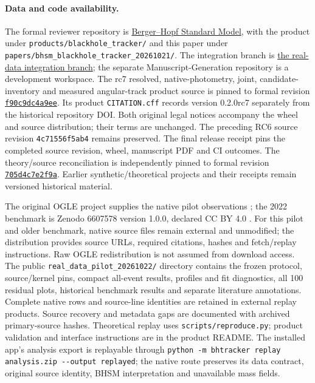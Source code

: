 \documentclass[11pt,a4paper]{article}
\begin{document}
\paragraph{Data and code availability.}
The formal reviewer repository is
\href{https://github.com/ncarberry64/Berger-Hopf-Standard-Model}{Berger--Hopf Standard Model},
with the product under \nolinkurl{products/blackhole_tracker/} and this
paper under \nolinkurl{papers/bhsm_blackhole_tracker_20261021/}.
The integration branch is
\href{https://github.com/ncarberry64/Berger-Hopf-Standard-Model/tree/codex/blackhole-tracker-real-data-20261022}{the real-data integration branch};
the separate Manuscript-Generation repository is a development workspace.
The rc7 resolved, native-photometry, joint, candidate-inventory and
measured angular-track product source is pinned to formal revision
\href{https://github.com/ncarberry64/Berger-Hopf-Standard-Model/tree/f90c9dc4a9eed262ca3b2291b3320f47bb4a5333/products/blackhole_tracker}{\texttt{f90c9dc4a9ee}}.
Its product \texttt{CITATION.cff} records version 0.2.0rc7 separately from
the historical repository DOI. Both original legal notices accompany the
wheel and source distribution; their terms are unchanged. The preceding
RC6 source revision \texttt{4c71556f5ab4} remains preserved.
The final release receipt pins the completed source revision, wheel,
manuscript PDF and CI outcomes. The theory/source reconciliation is
independently pinned to formal revision
\href{https://github.com/ncarberry64/Berger-Hopf-Standard-Model/tree/705d4c7e2f9a832b457f63ff975e7d4dc8008645}{\texttt{705d4c7e2f9a}}.
Earlier synthetic/theoretical projects and their receipts remain
versioned historical material.

The original OGLE project supplies the native pilot observations
\cite{Wyrzykowski2015}; the 2022 benchmark is Zenodo 6607578 version
1.0.0, declared CC BY 4.0 \cite{Lam2022Data}. For this pilot and older
benchmark, native source files remain
external and unmodified; the distribution provides source URLs, required
citations, hashes and fetch/replay instructions. Raw OGLE redistribution
is not assumed from download access. The public
\texttt{real\_data\_pilot\_20261022/} directory contains the frozen protocol,
source/kernel pins, compact all-event results, profiles and fit
diagnostics, all 100 residual plots, historical benchmark results and
separate literature annotations. Complete native rows and source-line
identities are retained in external replay products. Source recovery and
metadata gaps are documented with archived primary-source hashes.
Theoretical replay uses \texttt{scripts/reproduce.py}; product validation
and interface instructions are in the product README. The installed
app's analysis export is replayable through
\texttt{python -m bhtracker replay analysis.zip -{}-output replayed};
the native route preserves its data contract, original source identity,
BHSM interpretation and unavailable mass fields.
\end{document}

